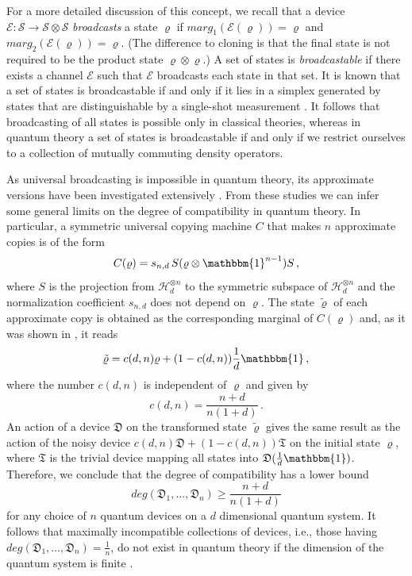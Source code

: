 \documentclass[12pt]{article}
\theoremstyle{definition}
\newcommand{\hi}{\mathcal{H}} %
\newcommand{\id}{\mathbbm{1}} %
\newcommand{\Ec}{\mathcal{E}} %
\newcommand{\Dev}{\mathfrak{D}} %
\newcommand{\Triv}{\mathfrak{T}} %
\begin{document}
For a more detailed discussion of this concept, we recall that a device $\Ec:\mathcal{S}\to\mathcal{S}\otimes\mathcal{S}$ \emph{broadcasts} a state $\varrho$ if $marg_1 (\Ec(\varrho)) = \varrho$ and $marg_2(\Ec(\varrho)) = \varrho$.
(The difference to cloning is that the final state is not required to be the product state $\varrho\otimes\varrho$.)
A set of states is \emph{broadcastable} if there exists a channel $\Ec$ such that $\Ec$ broadcasts each state in that set.
It is known that a set of states is broadcastable if and only if it lies in a simplex generated by states that are distinguishable by a single-shot measurement \cite{BaBaLeWi07}.
It follows that broadcasting of all states is possible only in classical theories, whereas in quantum theory a set of states is broadcastable if and only if we restrict ourselves to a collection of mutually commuting density operators.

As universal broadcasting is impossible in quantum theory, its approximate versions have been investigated extensively \cite{ScIbGiAc05}.
From these studies we can infer some general limits on the degree of compatibility in quantum theory. 
In particular, a symmetric universal copying machine $C$ that makes $n$ approximate copies is of the form \cite{KeWe99}
\begin{equation}
C(\varrho) = s_{n,d} \, S(\varrho \otimes \id^{n-1}) S\, , 
\end{equation}
where $S$ is the projection from $\hi_d^{\otimes n}$ to the symmetric subspace of $\hi_d^{\otimes n}$ and the normalization coefficient $s_{n,d}$ does not depend on $\varrho$.
The state $\tilde{\varrho}$ of each approximate copy is obtained as the corresponding marginal of $C(\varrho)$ and, as it was shown in \cite{Werner98}, it reads
\begin{equation}
\tilde{\varrho} = c(d,n) \varrho + (1-c(d,n)) \frac{1}{d} \id \, ,
\end{equation}
where the number $c(d,n)$ is independent of $\varrho$ and given by
\begin{equation}
c(d,n) = \frac{n+d}{n(1+d)} \, .
\end{equation} 
An action of a device $\Dev$ on the transformed state $\tilde{\varrho}$ gives the same result as the action of the noisy device $c(d,n) \Dev + (1-c(d,n)) \Triv$ on the initial state $\varrho$, where $\Triv$ is the trivial device mapping all states into $\Dev(\frac{1}{d} \id)$.
Therefore, we conclude that the degree of compatibility has a lower bound
\begin{equation}\label{eq:bc-bound}
deg(\Dev_1,\ldots,\Dev_n) \geq \frac{n+d}{n(1+d)}
\end{equation}
for any choice of $n$ quantum devices on a $d$ dimensional quantum system.
It follows that maximally incompatible collections of devices, i.e., those having $deg(\Dev_1,\ldots,\Dev_n) = \frac{1}{n}$, do not exist in quantum theory if the dimension of the quantum system is finite \cite{HeScToZi14}.
\end{document}
